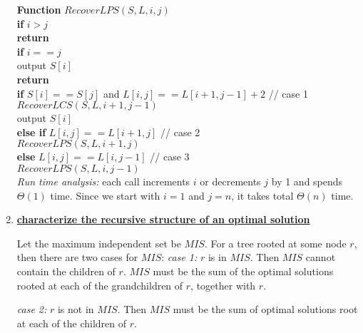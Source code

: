 \documentclass[11pt]{article}
\begin{document}
\begin{enumerate}
  \textbf{Function} $RecoverLPS(S, L, i, j)$\\
  \-\hspace{2em} \textbf{if} $i > j$\\
  \-\hspace{4em} \textbf{return}\\
  \-\hspace{2em} \textbf{if} $i == j$\\
  \-\hspace{4em} output $S[i]$\\
  \-\hspace{4em} \textbf{return}\\
  \-\hspace{2em} \textbf{if} $S[i] == S[j]$ and $L[i,j] == L[i+1,
    j-1]+2$  // case 1\\ 
  \-\hspace{4em} $RecoverLCS(S, L, i+1, j-1)$\\
  \-\hspace{4em} output $S[i]$\\
  \-\hspace{2em} \textbf{else if} $L[i,j] == L[i+1,j]$ // case 2\\
  \-\hspace{4em} $RecoverLPS(S, L, i+1, j)$\\
  \-\hspace{2em} \textbf{else} $L[i,j] == L[i,j-1]$ // case 3\\
  \-\hspace{4em} $RecoverLPS(S, L, i, j-1)$\\

  \emph{Run time analysis:} each call increments $i$ or decrements
  $j$ by 1 and spends $\Theta(1)$ time. Since we start with $i=1$
  and $j=n$, it takes total $\Theta(n)$ time.

\item %

  \underline{\textbf{characterize the recursive structure of an
      optimal solution}} 

  Let the maximum independent set be $MIS$.
  For a tree rooted at some node $r$, then there are two cases for
  $MIS$: 
  \emph{case 1:} $r$ is in $MIS$. Then $MIS$ cannot contain the
  children of $r$. $MIS$ must be the sum of the optimal solutions
  rooted at each of the grandchildren of $r$, together with $r$.

  \emph{case 2:} $r$ is not in $MIS$. Then $MIS$ must be the sum of
  optimal solutions root at each of the children of $r$. 



\end{enumerate}
\end{document}
